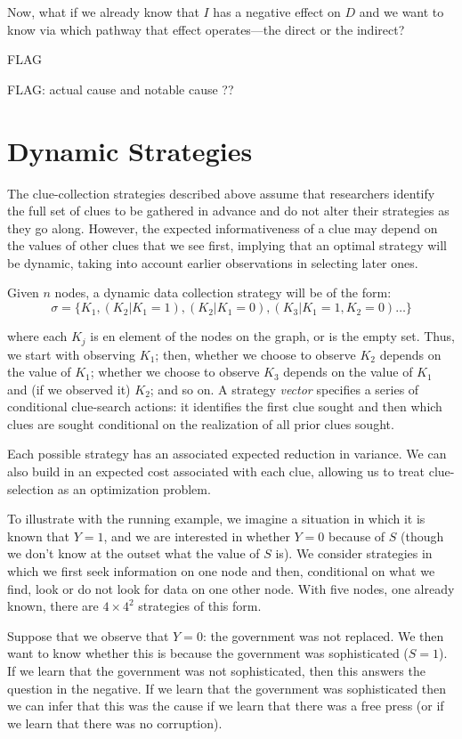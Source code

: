 \documentclass[
  12pt,
]{book}
\begin{document}
Now, what if we already know that \(I\) has a negative effect on \(D\) and we want to know via which pathway that effect operates---the direct or the indirect?

FLAG

FLAG: actual cause and notable cause ??

\hypertarget{dynamic-strategies}{%
\section{Dynamic Strategies}\label{dynamic-strategies}}

The clue-collection strategies described above assume that researchers identify the full set of clues to be gathered in advance and do not alter their strategies as they go along. However, the expected informativeness of a clue may depend on the values of other clues that we see first, implying that an optimal strategy will be dynamic, taking into account earlier observations in selecting later ones.

Given \(n\) nodes, a dynamic data collection strategy will be of the form:
\[\sigma = \{K_1, (K_2|K_1 = 1), (K_2|K_1 = 0), (K_3|K_1=1, K_2 =0)\dots\}\]

where each \(K_j\) is en element of the nodes on the graph, or is the empty set. Thus, we start with observing \(K_1\); then, whether we choose to observe \(K_2\) depends on the value of \(K_1\); whether we choose to observe \(K_3\) depends on the value of \(K_1\) and (if we observed it) \(K_2\); and so on. A strategy \emph{vector} specifies a series of conditional clue-search actions: it identifies the first clue sought and then which clues are sought conditional on the realization of all prior clues sought.

Each possible strategy has an associated expected reduction in variance. We can also build in an expected cost associated with each clue, allowing us to treat clue-selection as an optimization problem.

To illustrate with the running example, we imagine a situation in which it is known that \(Y=1\), and we are interested in whether \(Y=0\) because of \(S\) (though we don't know at the outset what the value of \(S\) is). We consider strategies in which we first seek information on one node and then, conditional on what we find, look or do not look for data on one other node. With five nodes, one already known, there are \(4 \times 4^2\) strategies of this form.

Suppose that we observe that \(Y=0\): the government was not replaced. We then want to know whether this is because the government was sophisticated (\(S=1\)). If we learn that the government was not sophisticated, then this answers the question in the negative. If we learn that the government was sophisticated then we can infer that this was the cause if we learn that there was a free press (or if we learn that there was no corruption).
\end{document}

